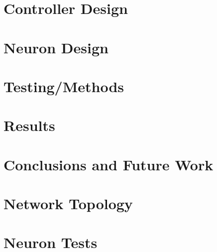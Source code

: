 \documentclass[12pt, letterpaper, oneside, onecolumn]{report} %
\begin{document}
\chapter{Controller Design}
\label{chap:controller_design}


\chapter{Neuron Design}
\label{chap:neuron_design}


\chapter{Testing/Methods}
\label{chap:methods}


\chapter{Results}
\label{chap:results}


\chapter{Conclusions and Future Work}
\label{chap:conclusion}


\newpage
\label{chap:references}
\printbibliography[heading=bibintoc, title={Bibliography}]

\newpage
\appendix
{}
\chapter{Network Topology}
\label{app:network_topologies}


\chapter{Neuron Tests}
\label{app:neuron_tests}

\end{document}

